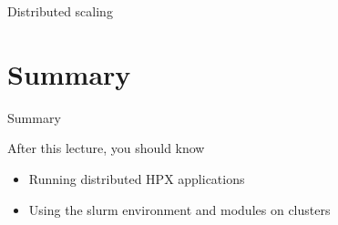 \documentclass[12pt,t]{beamer}
\begin{document}
\begin{frame}{Distributed scaling}

\begin{center}
\end{center}
\end{frame}

\section{Summary}
\begin{frame}{Summary}
\begin{block}{After this lecture, you should know}
\begin{itemize}
\item Running distributed HPX applications
\item Using the slurm environment and modules on clusters
\end{itemize}
\end{block}
\end{frame}
\end{document}
